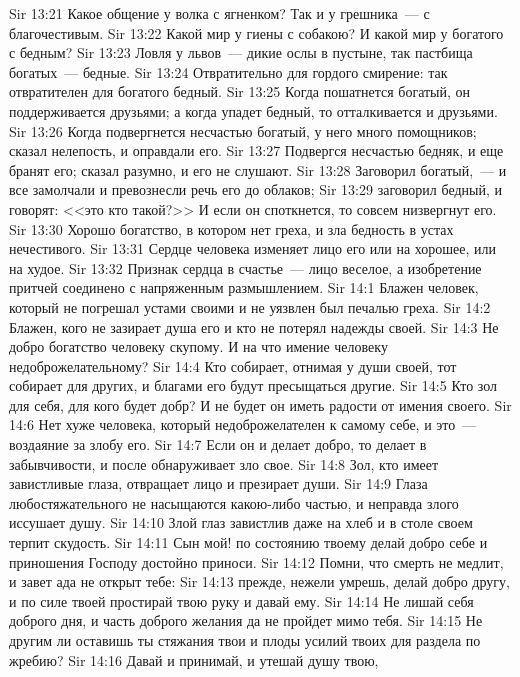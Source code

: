\vs Sir 13:21 Какое общение у волка с ягненком? Так и у грешника~--- с благочестивым.
\vs Sir 13:22 Какой мир у гиены с собакою? И какой мир у богатого с бедным?
\vs Sir 13:23 Ловля у львов~--- дикие ослы в пустыне, так пастбища богатых~--- бедные.
\vs Sir 13:24 Отвратительно для гордого смирение: так отвратителен для богатого бедный.
\vs Sir 13:25 Когда пошатнется богатый, он поддерживается друзьями; а когда упадет бедный, то отталкивается и друзьями.
\vs Sir 13:26 Когда подвергнется несчастью богатый, у него много помощников; сказал нелепость, и оправдали его.
\vs Sir 13:27 Подвергся несчастью бедняк, и еще бранят его; сказал разумно, и его не слушают.
\vs Sir 13:28 Заговорил богатый,~--- и все замолчали и превознесли речь его до облаков;
\vs Sir 13:29 заговорил бедный, и говорят: <<это кто такой?>> И если он споткнется, то совсем низвергнут его.
\rsbpar\vs Sir 13:30 Хорошо богатство, в котором нет греха, и зла бедность в устах нечестивого.
\vs Sir 13:31 Сердце человека изменяет лицо его или на хорошее, или на худое.
\vs Sir 13:32 Признак сердца в счастье~--- лицо веселое, а изобретение притчей соединено с напряженным размышлением.
\vs Sir 14:1 Блажен человек, который не погрешал устами своими и не уязвлен был печалью греха.
\vs Sir 14:2 Блажен, кого не зазирает душа его и кто не потерял надежды своей.
\vs Sir 14:3 Не добро богатство человеку скупому. И на что имение человеку недоброжелательному?
\vs Sir 14:4 Кто собирает, отнимая у души своей, тот собирает для других, и благами его будут пресыщаться другие.
\vs Sir 14:5 Кто зол для себя, для кого будет добр? И не будет он иметь радости от имения своего.
\vs Sir 14:6 Нет хуже человека, который недоброжелателен к самому себе, и это~--- воздаяние за злобу его.
\vs Sir 14:7 Если он и делает добро, то делает в забывчивости, и после обнаруживает зло свое.
\vs Sir 14:8 Зол, кто имеет завистливые глаза, отвращает лицо и презирает души.
\vs Sir 14:9 Глаза любостяжательного не насыщаются какою-либо частью, и неправда злого иссушает душу.
\vs Sir 14:10 Злой глаз завистлив даже на хлеб и в столе своем терпит скудость.
\vs Sir 14:11 Сын мой! по состоянию твоему делай добро себе и приношения Господу достойно приноси.
\vs Sir 14:12 Помни, что смерть не медлит, и завет ада не открыт тебе:
\vs Sir 14:13 прежде, нежели умрешь, делай добро другу, и по силе твоей простирай твою руку и давай ему.
\vs Sir 14:14 Не лишай себя доброго дня, и часть доброго желания да не пройдет мимо тебя.
\vs Sir 14:15 Не другим ли оставишь ты стяжания твои и плоды усилий твоих для раздела по жребию?
\vs Sir 14:16 Давай и принимай, и утешай душу твою,

